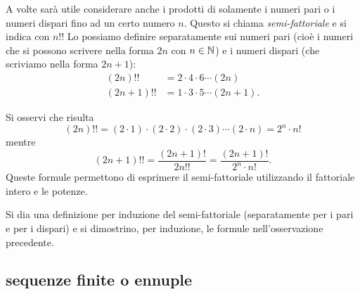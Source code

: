   A volte sarà utile considerare anche i prodotti di solamente i numeri
  pari o i numeri dispari fino ad un certo numero $n$. Questo
  si chiama \emph{semi-fattoriale}%
%
 e si indica con $n!!$
  Lo possiamo definire separatamente sui numeri pari (cioè 
  i numeri che si possono scrivere nella forma $2n$ con $n\in {\mathbb N}$)
  e i numeri dispari (che scriviamo nella forma $2n+1$):
  \begin{align*}
    (2n)!! &= 2 \cdot 4 \cdot 6 \cdots (2n) \\
    (2n+1)!! &= 1 \cdot 3 \cdot 5 \cdots (2n+1).
  \end{align*}
  
  \begin{remark}
  \label{rem:doppio_fattoriale}%
  Si osservi che risulta
  \[
    (2n)!! = (2\cdot 1) \cdot (2\cdot 2) \cdot (2\cdot 3) \cdots (2\cdot n)
          = 2^n \cdot n!
  \]
  mentre
  \[
    (2n+1)!! = \frac{(2n+1)!}{2n!!} = \frac{(2n+1)!}{2^n\cdot n!}.
  \]
  Queste formule permettono di esprimere il semi-fattoriale utilizzando
  il fattoriale intero e le potenze.
  \end{remark}
  
\begin{exercise}
  Si dia una definizione per induzione del semi-fattoriale
  (separatamente per i pari e per i dispari)
  e si dimostrino, per induzione, le formule nell'osservazione precedente.
\end{exercise}


\subsection{sequenze finite o ennuple}
%
%

